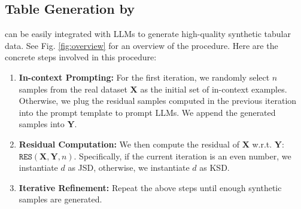\subsection{Table Generation by \modelname}
\modelname can be easily integrated with LLMs to generate high-quality synthetic tabular data. See Fig. \ref{fig:overview} for an overview of the procedure. Here are the concrete steps involved in this procedure:
\begin{enumerate}[leftmargin=*]
  \item \textbf{In-context Prompting:}  For the first iteration, we randomly select $n$ samples from the real dataset $\boldsymbol{X}$ as the initial set of in-context examples.
  Otherwise, we plug the residual samples computed in the previous iteration into the prompt template to prompt LLMs. 
  We append the generated samples into $\boldsymbol{Y}$.
  \item \textbf{Residual Computation:} We then compute the residual of $\boldsymbol{X}$ w.r.t. $\boldsymbol{Y}$: $\texttt{RES}(\boldsymbol{X}, \boldsymbol{Y}, n)$. Specifically, if the current iteration is an even number, we instantiate $d$ as JSD, otherwise, we instantiate $d$ as KSD.
  \item \textbf{Iterative Refinement:} Repeat the above steps until enough synthetic samples are generated.
\end{enumerate}

